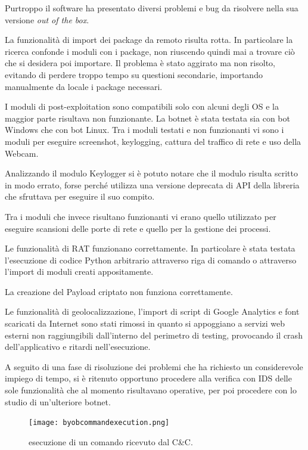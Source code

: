 Purtroppo il software ha presentato diversi problemi e bug da risolvere nella sua versione \textit{out of the box}. 

La funzionalità di import dei   package da remoto risulta rotta. In particolare la ricerca confonde i moduli con i package,  non riuscendo quindi mai a trovare ciò che si desidera poi importare. Il problema è stato aggirato ma non risolto, evitando di perdere troppo tempo su questioni secondarie, importando manualmente da locale i package necessari.

I moduli di post-exploitation sono compatibili solo con alcuni degli OS e la maggior parte risultava non funzionante. 
La botnet è stata testata sia con bot Windows che con bot Linux.
Tra i moduli  testati e non funzionanti vi sono i moduli per eseguire screenshot, keylogging, cattura del traffico di rete e uso della  Webcam.

Analizzando il modulo Keylogger si è potuto notare che il modulo risulta scritto in modo errato, forse perché utilizza una versione deprecata di API della libreria che sfruttava per eseguire il suo compito. 

Tra i moduli che invece risultano funzionanti vi erano quello utilizzato per eseguire scansioni delle porte di rete e quello per la gestione dei processi.

Le funzionalità di RAT funzionano correttamente.
In particolare è stata testata l'esecuzione di codice Python arbitrario attraverso riga di comando o  attraverso l'import di moduli creati appositamente.

La  creazione del Payload criptato non funziona correttamente.


Le funzionalità di geolocalizzazione, l'import di script di Google Analytics e font scaricati da Internet sono stati rimossi in quanto si appoggiano a servizi web esterni non raggiungibili dall'interno del perimetro di testing, provocando  il crash dell'applicativo e ritardi nell'esecuzione.



A seguito di una fase di risoluzione dei problemi che ha richiesto un considerevole impiego di tempo, si è ritenuto opportuno procedere alla verifica con IDS delle sole funzionalità che al momento risultavano operative, per poi procedere con lo studio di un'ulteriore botnet.
\begin{figure}[hbtp]
    \centering
    \texttt{[image: byobcommandexecution.png]}
    \caption{esecuzione di un comando ricevuto dal C\&C.}
    \label{fig:byobcommandexecution}
\end{figure}
